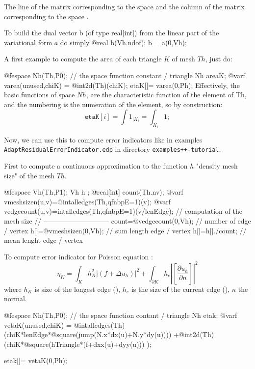 \documentclass[a4paper,twoside,12pt]{book}
\begin{document}
\begin{note}
The line of the matrix corresponding to the space  and the
column of the matrix corresponding to the space .
\end{note}

To build the dual vector b (of type real[int])  from the linear part of the variational form $a$ do simply
\bFF
  @real b(Vh.ndof);
  b = a(0,Vh);
\eFF

A first example to compute the area of each triangle $K$ of mesh $Th$,  just do:

\bFF
  @fespace Nh(Th,P0); // the  space function constant / triangle
   Nh areaK;
   @varf varea(unused,chiK) =  @int2d(Th)(chiK);	
   etaK[]= varea(0,Ph);
\eFF
Effectively, the basic functions of space $Nh$, are the characteristic function
of the element of Th, and the numbering is the numeration of the element,
so by construction:
$$
 \mathtt{etaK}[i] = \int {1}_{|K_i} = \int_{K_i} 1;
 $$

Now, we can use this to compute error indicators like in examples
\texttt{AdaptResidualErrorIndi\-cator.edp} in directory \texttt{examples++-tutorial}.

First to compute a continuous approximation to the function $h$ "density mesh size"  of the mesh $Th$.

\bFF
  @fespace Vh(Th,P1);
   Vh h ;
   @real[int]  count(Th.nv); 	
   @varf vmeshsizen(u,v)=@intalledges(Th,qfnbpE=1)(v);
   @varf vedgecount(u,v)=intalledges(Th,qfnbpE=1)(v/lenEdge);
   //	  computation of the mesh size
   //   -----------------------------
   count=@vedgecount(0,Vh); // number of edge / vertex
   h[]=@vmeshsizen(0,Vh); //  sum length edge / vertex
   h[]=h[]./count; // mean lenght edge / vertex 	
\eFF


To compute error indicator for Poisson equation :
$$
{ \eta_K =   \int_K h_K^2 |( f + \Delta u_h)|^2  + \int_{\partial K} h_e |[ \frac{\partial u_h}{\partial n} ]|^2  }
$$
where $ h_K$ is size of the longest edge (), $h_e$ is the size of the current edge (), $n$ the
normal.

\bFF
  @fespace Nh(Th,P0); // the  space function contant / triangle
   Nh etak;
  @varf vetaK(unused,chiK) =
       @intalledges(Th)(chiK*lenEdge*@square(jump(N.x*dx(u)+N.y*dy(u))))
      +@int2d(Th)(chiK*@square(hTriangle*(f+dxx(u)+dyy(u))) );
	
   etak[]= vetaK(0,Ph);
\eFF


%
%
\end{document}

